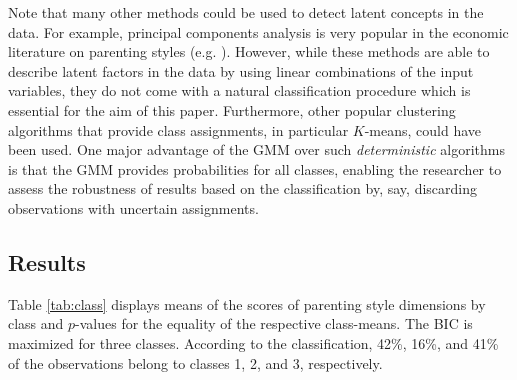 Note that many other methods could be used to detect latent concepts in the data. For example, principal components analysis is very popular in the economic literature on parenting styles (e.g. \cite{ermischOriginsSocialImmobility2008, fioriniHowAllocationChildren2014, bonoEarlyMaternalTime2016, cobb-clarkParentingStyleInvestment2019, zumbuehlParentalInvolvementIntergenerational2020}). However, while these methods are able to describe latent factors in the data by using linear combinations of the input variables, they do not come with a natural classification procedure which is essential for the aim of this paper. Furthermore, other popular clustering algorithms that provide class assignments, in particular $K$-means, could have been used. One major advantage of the GMM over such \textit{deterministic} algorithms is that the GMM provides probabilities for all classes, enabling the researcher to assess the robustness of results based on the classification by, say, discarding observations with uncertain assignments.
%
%
\subsection{Results}
Table \ref{tab:class} displays means of the scores of parenting style dimensions by class and $p$-values for the equality of the respective class-means. The BIC is maximized for three classes. According to the classification, 42\%, 16\%, and 41\% of the observations belong to classes 1, 2, and 3, respectively.


